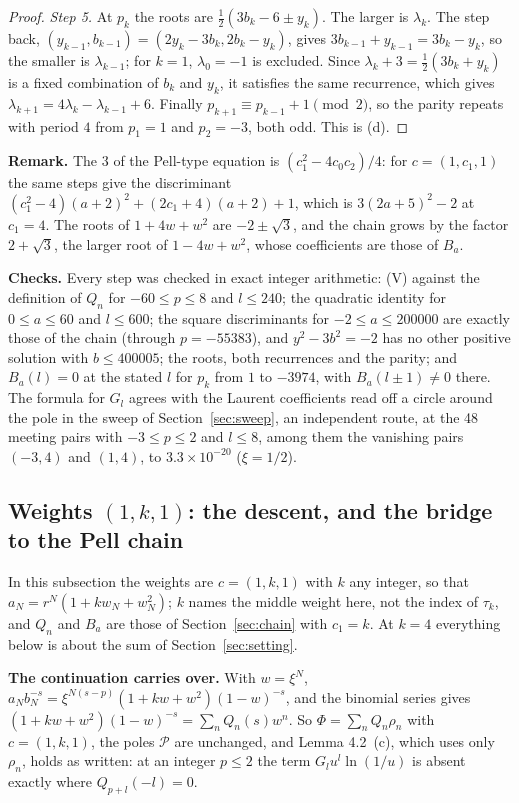 \documentclass[11pt]{article}
\begin{document}
\begin{proof}
\emph{Step 5.} At $p_k$ the roots are $\frac12(3b_k-6\pm y_k)$. The larger is $\lambda_k$. The step back, $(y_{k-1},b_{k-1})=(2y_k-3b_k,2b_k-y_k)$, gives $3b_{k-1}+y_{k-1}=3b_k-y_k$, so the smaller is $\lambda_{k-1}$; for $k=1$, $\lambda_0=-1$ is excluded. Since $\lambda_k+3=\frac12(3b_k+y_k)$ is a fixed combination of $b_k$ and $y_k$, it satisfies the same recurrence, which gives $\lambda_{k+1}=4\lambda_k-\lambda_{k-1}+6$. Finally $p_{k+1}\equiv p_{k-1}+1\pmod2$, so the parity repeats with period $4$ from $p_1=1$ and $p_2=-3$, both odd. This is (d).
\end{proof}

\noindent\textbf{Remark.} The $3$ of the Pell-type equation is $(c_1^2-4c_0c_2)/4$: for $c=(1,c_1,1)$ the same steps give the discriminant $(c_1^2-4)(a+2)^2+(2c_1+4)(a+2)+1$, which is $3(2a+5)^2-2$ at $c_1=4$. The roots of $1+4w+w^2$ are $-2\pm\sqrt3$, and the chain grows by the factor $2+\sqrt3$, the larger root of $1-4w+w^2$, whose coefficients are those of $B_a$.

\noindent\textbf{Checks.} Every step was checked in exact integer arithmetic: (V) against the definition of $Q_n$ for $-60\le p\le8$ and $l\le240$; the quadratic identity for $0\le a\le60$ and $l\le600$; the square discriminants for $-2\le a\le200000$ are exactly those of the chain (through $p=-55383$), and $y^2-3b^2=-2$ has no other positive solution with $b\le400005$; the roots, both recurrences and the parity; and $B_a(l)=0$ at the stated $l$ for $p_k$ from $1$ to $-3974$, with $B_a(l\pm1)\ne0$ there. The formula for $G_l$ agrees with the Laurent coefficients read off a circle around the pole in the sweep of Section~\ref{sec:sweep}, an independent route, at the 48 meeting pairs with $-3\le p\le2$ and $l\le8$, among them the vanishing pairs $(-3,4)$ and $(1,4)$, to $3.3\times10^{-20}$ ($\xi=1/2$).

\subsection{\texorpdfstring{Weights $(1,k,1)$}{Weights (1, k, 1)}: the descent, and the bridge to the Pell chain}\label{sec:family}

In this subsection the weights are $c=(1,k,1)$ with $k$ any integer, so that $a_N=r^N(1+kw_N+w_N^2)$; $k$ names the middle weight here, not the index of $\tau_k$, and $Q_n$ and $B_a$ are those of Section~\ref{sec:chain} with $c_1=k$. At $k=4$ everything below is about the sum of Section~\ref{sec:setting}.

\medskip
\noindent\textbf{The continuation carries over.} With $w=\xi^N$, $a_Nb_N^{-s}=\xi^{N(s-p)}(1+kw+w^2)(1-w)^{-s}$, and the binomial series gives $(1+kw+w^2)(1-w)^{-s}=\sum_nQ_n(s)w^n$. So $\Phi=\sum_nQ_n\rho_n$ with $c=(1,k,1)$, the poles $\mathcal{P}$ are unchanged, and Lemma 4.2~(c), which uses only $\rho_n$, holds as written: at an integer $p\le2$ the term $G_lu^l\ln(1/u)$ is absent exactly where $Q_{p+l}(-l)=0$.
\end{document}

